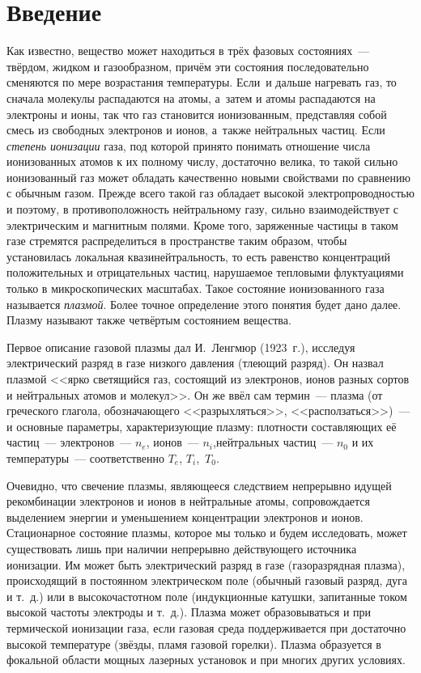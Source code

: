 \section{Введение}

Как известно, вещество может находиться в трёх фазовых состояниях~--- твёрдом, жидком и газообразном, причём эти
состояния последовательно сменяются по мере возрастания температуры. Если~и дальше нагревать газ, то сначала молекулы
распадаются на атомы, а~затем и атомы распадаются на электроны и ионы, так что газ становится ионизованным, представляя
собой смесь из свободных электронов и ионов, а~также нейтральных частиц. Если \textit{степень ионизации} газа, под которой
принято понимать отношение числа ионизованных атомов к их полному числу, достаточно велика, то такой сильно ионизованный
газ может обладать качественно новыми свойствами по сравнению с обычным газом. Прежде всего такой газ обладает высокой
электропроводностью и поэтому, в противоположность нейтральному газу, сильно взаимодействует с электрическим и магнитным
полями. Кроме того, заряженные частицы в таком газе стремятся распределиться в пространстве таким образом, чтобы
установилась локальная квазинейтральность, то есть равенство концентраций положительных и отрицательных частиц,
нарушаемое тепловыми флуктуациями только в микроскопических масштабах. Такое состояние ионизованного газа называется
\textit{плазмой}. Более точное определение этого понятия будет дано далее. Плазму называют также четвёртым состоянием
вещества.


Первое описание газовой плазмы дал И.~Ленгмюр (1923~г.), исследуя электрический разряд в газе низкого давления (тлеющий
разряд). Он назвал плазмой <<ярко светящийся газ, состоящий из электронов, ионов разных сортов и нейтральных атомов и
молекул>>. Он же ввёл сам термин~--- плазма (от греческого глагола, обозначающего <<разрыхляться>>,
<<расползаться>>)~--- и основные параметры, характеризующие плазму: плотности составляющих её частиц~--- электронов~---
$n_e$, ионов~--- $n_i$,нейтральных частиц~--- $n_0$ и их температуры~--- соответственно $T_e$, $T_i$,~$T_0$.

Очевидно, что свечение плазмы, являющееся следствием непрерывно идущей рекомбинации электронов и ионов в нейтральные
атомы, сопровождается выделением энергии и уменьшением концентрации электронов и ионов. Стационарное состояние плазмы,
которое мы только и будем исследовать, может существовать лишь при наличии непрерывно действующего источника ионизации.
Им может быть электрический разряд в газе (газоразрядная плазма), происходящий в постоянном электрическом поле (обычный
газовый разряд, дуга и т.~д.) или в высокочастотном поле (индукционные катушки, запитанные током высокой частоты
электроды и т.~д.). Плазма может образовываться и при термической ионизации газа, если газовая среда поддерживается при
достаточно высокой температуре (звёзды, пламя газовой горелки). Плазма образуется в фокальной области мощных лазерных
установок и при многих других условиях.

